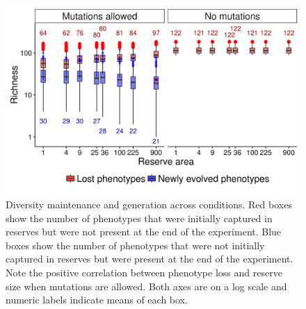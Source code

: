 \documentclass[letterpaper]{article}
\begin{document}
\begin{figure}[h]
	\centering
	\includegraphics[]{DiversityGenerationMaintenance.png}
    \caption{Diversity maintenance and generation across conditions. Red boxes show the number of phenotypes that were initially captured in reserves but were not present at the end of the experiment. Blue boxes show the number of phenotypes that were not initially captured in reserves but were present at the end of the experiment. Note the positive correlation between phenotype loss and reserve size when mutations are allowed. Both axes are on a log scale and numeric labels indicate means of each box.}
    \label{fig:diversitygenerationmaintenance}
\end{figure}%
%
%
%
%
%
%
%
%
%
%
\end{document}
